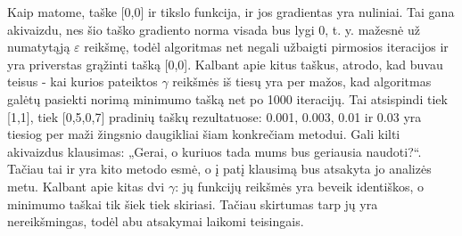 \documentclass{article}
\begin{document}
Kaip matome, taške [0,0] ir tikslo funkcija, ir jos gradientas yra nuliniai. Tai gana akivaizdu, nes šio taško gradiento norma visada bus lygi 0, t. y. mažesnė už numatytąją $\varepsilon$ reikšmę, todėl algoritmas net negali užbaigti pirmosios iteracijos ir yra priverstas grąžinti tašką [0,0]. Kalbant apie kitus taškus, atrodo, kad buvau teisus - kai kurios pateiktos $\gamma$ reikšmės iš tiesų yra per mažos, kad algoritmas galėtų pasiekti norimą minimumo tašką net po 1000 iteracijų. Tai atsispindi tiek [1,1], tiek [0,5,0,7] pradinių taškų rezultatuose: 0.001, 0.003, 0.01 ir 0.03 yra tiesiog per maži žingsnio daugikliai šiam konkrečiam metodui. Gali kilti akivaizdus klausimas: „Gerai, o kuriuos tada mums bus geriausia naudoti?“. Tačiau tai ir yra kito metodo esmė, o į patį klausimą bus atsakyta jo analizės metu. Kalbant apie kitas dvi $\gamma$: jų funkcijų reikšmės yra beveik identiškos, o minimumo taškai tik šiek tiek skiriasi. Tačiau skirtumas tarp jų yra nereikšmingas, todėl abu atsakymai laikomi teisingais.
\end{document}
